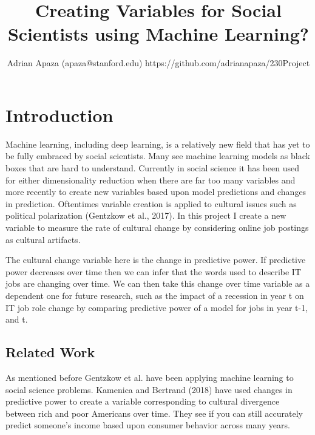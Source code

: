 \documentclass[11pt, oneside]{article}   	%
\title{Creating Variables for Social Scientists using Machine Learning?}
\author{Adrian Apaza (apaza@stanford.edu) https://github.com/adrianapaza/230Project}
\begin{document}
\maketitle
\section{Introduction}

Machine learning, including deep learning, is a relatively new field that has yet to be fully embraced by social scientists. Many see machine learning models as black boxes that are hard to understand.  Currently in social science it has been used for either dimensionality reduction when there are far too many variables and more recently to create new variables based upon model predictions and changes in prediction. Oftentimes variable creation is applied to cultural issues such as political polarization (Gentzkow et al., 2017). In this project I create a new variable to measure the rate of cultural change by considering online job postings as cultural artifacts.

The cultural change variable here is the change in predictive power. If predictive power decreases over time then we can infer that the words used to describe IT jobs are changing over time. We can then take this change over time variable as a dependent one for future research, such as the impact of a recession in year t on IT job role change by comparing predictive power of a model for jobs in year t-1, and t.

\subsection{Related Work}
As mentioned before Gentzkow et al. have been applying machine learning to social science problems.  Kamenica and Bertrand (2018) have used changes in predictive power to create a variable corresponding to cultural divergence between rich and poor Americans over time. They see if you can still accurately predict someone's income based upon consumer behavior across many years.
\end{document}
